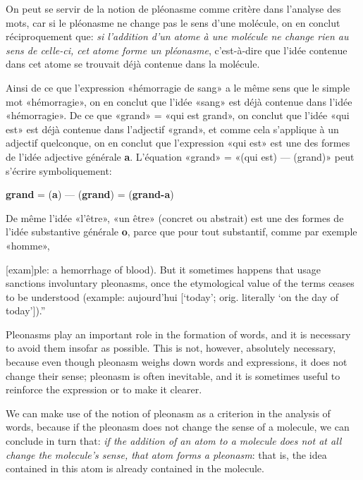 \begin{sloppypar}
{{      On peut se servir de la notion de pléonasme comme critère dans
      l'analyse des mots, car si le pléonasme ne change pas le sens
      d’une molécule, on en conclut réciproquement que: \emph{si
        l'addition d'un atome à une molécule ne change rien au sens de
        celle-ci, cet atome forme un pléonasme}, c’est-à-dire que
      l’idée contenue dans cet atome se trouvait déjà contenue dans la
      molécule.

      Ainsi de ce que l’expression «hémorragie de sang» a le même sens
      que le simple mot «hémorragie», on en conclut que l’idée «sang»
      est déjà contenue dans l’idée «hémorragie». De ce que «grand» =
      «qui est grand», on conclut que l’idée «qui est» est déjà
      contenue dans l'adjectif «grand», et comme cela s’applique à un
      adjectif quelconque, on en conclut que l’expression «qui est»
      est une des formes de l’idée adjective générale
      \textbf{a}. L’équation «grand» = «(qui est) — (grand)» peut
      s’écrire symboliquement:

    \begin{center}
      \textbf{grand} = (\textbf{a}) — (\textbf{grand}) =
      (\textbf{grand-a})
    \end{center}

    De même l'idée «l’être», «un être» (concret ou abstrait) est une
    des formes de l’idée substantive générale \textbf{o}, parce que
    pour tout substantif, comme par exemple «homme», } }
%
{\noindent
  {\small [exam]ple: a hemorrhage of blood). But it sometimes happens
    that usage sanctions involuntary pleonasms, once the etymological
    value of the terms ceases to be understood (example: aujourd'hui
    [`today'; orig. literally `on the day of today']).''

    Pleonasms play an important role in the formation of words, and it
    is necessary to avoid them insofar as possible. This is not,
    however, absolutely necessary, because even though pleonasm weighs
    down words and expressions, it does not change their sense;
    pleonasm is often inevitable, and it is sometimes useful to
    reinforce the expression or to make it clearer.

    We can make use of the notion of pleonasm as a criterion in the
    analysis of words, because if the pleonasm does not change the
    sense of a molecule, we can conclude in turn that: \emph{if the
      addition of an atom to a molecule does not at all change the
      molecule's sense, that atom forms a pleonasm}: that is, the idea
    contained in this atom is already contained in the molecule.

}}
\end{sloppypar}
